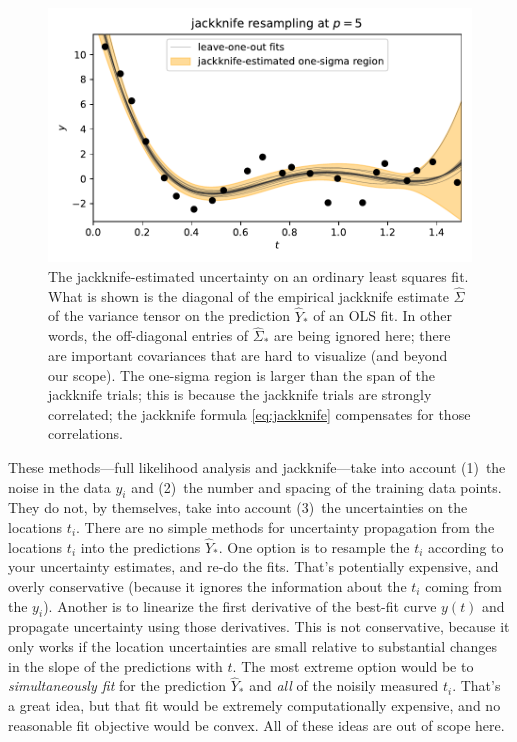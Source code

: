 \documentclass[12pt,letterpaper]{article}
\newlength{\figurewidth}
\begin{document}
\begin{figure}[t]
    \begin{mdframed}
    \includegraphics[width=\figurewidth]{paper/uncertainty.pdf}
    \caption{The jackknife-estimated uncertainty on an ordinary least squares fit. What is shown is the diagonal of the empirical jackknife estimate $\hat{\Sigma}$ of the variance tensor on the prediction $\hat{Y}_\ast$ of an OLS fit. In other words, the off-diagonal entries of $\hat{\Sigma}_\ast$ are being ignored here; there are important covariances that are hard to visualize (and beyond our scope). The one-sigma region is larger than the span of the jackknife trials; this is because the jackknife trials are strongly correlated; the jackknife formula \eqref{eq:jackknife} compensates for those correlations.}
    \label{fig:uncertainty}
    \end{mdframed}
\end{figure}

These methods---full likelihood analysis and jackknife---take into account (1)~the noise in the data $y_i$ and (2)~the number and spacing of the training data points.
They do not, by themselves, take into account (3)~the uncertainties on the locations $t_i$.
There are no simple methods for uncertainty propagation from the locations $t_i$ into the predictions $\hat{Y}_\ast$.
One option is to resample the $t_i$ according to your uncertainty estimates, and re-do the fits.
That's potentially expensive, and overly conservative (because it ignores the information about the $t_i$ coming from the $y_i$).
Another is to linearize the first derivative of the best-fit curve $y(t)$ and propagate uncertainty using those derivatives.
This is not conservative, because it only works if the location uncertainties are small relative to substantial changes in the slope of the predictions with $t$.
The most extreme option would be to \emph{simultaneously fit} for the prediction $\hat{Y}_\ast$ and \emph{all} of the noisily measured $t_i$.
That's a great idea, but that fit would be extremely computationally expensive, and no reasonable fit objective would be convex.
All of these ideas are out of scope here.
\end{document}
